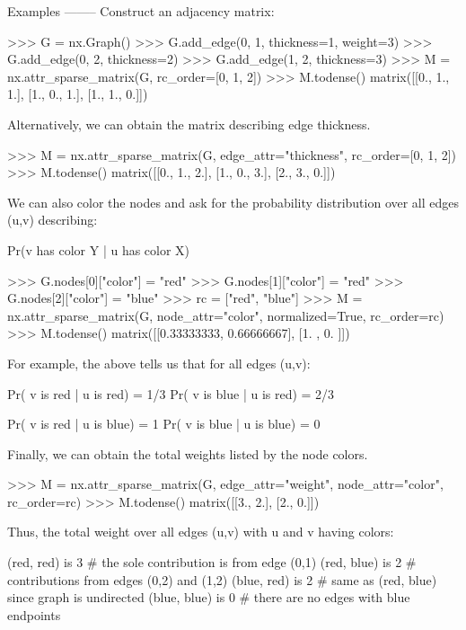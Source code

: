 \begin{DoxyVerb}
Examples
--------
Construct an adjacency matrix:

>>> G = nx.Graph()
>>> G.add_edge(0, 1, thickness=1, weight=3)
>>> G.add_edge(0, 2, thickness=2)
>>> G.add_edge(1, 2, thickness=3)
>>> M = nx.attr_sparse_matrix(G, rc_order=[0, 1, 2])
>>> M.todense()
matrix([[0., 1., 1.],
        [1., 0., 1.],
        [1., 1., 0.]])

Alternatively, we can obtain the matrix describing edge thickness.

>>> M = nx.attr_sparse_matrix(G, edge_attr="thickness", rc_order=[0, 1, 2])
>>> M.todense()
matrix([[0., 1., 2.],
        [1., 0., 3.],
        [2., 3., 0.]])

We can also color the nodes and ask for the probability distribution over
all edges (u,v) describing:

    Pr(v has color Y | u has color X)

>>> G.nodes[0]["color"] = "red"
>>> G.nodes[1]["color"] = "red"
>>> G.nodes[2]["color"] = "blue"
>>> rc = ["red", "blue"]
>>> M = nx.attr_sparse_matrix(G, node_attr="color", normalized=True, rc_order=rc)
>>> M.todense()
matrix([[0.33333333, 0.66666667],
        [1.        , 0.        ]])

For example, the above tells us that for all edges (u,v):

    Pr( v is red  | u is red)  = 1/3
    Pr( v is blue | u is red)  = 2/3

    Pr( v is red  | u is blue) = 1
    Pr( v is blue | u is blue) = 0

Finally, we can obtain the total weights listed by the node colors.

>>> M = nx.attr_sparse_matrix(G, edge_attr="weight", node_attr="color", rc_order=rc)
>>> M.todense()
matrix([[3., 2.],
        [2., 0.]])

Thus, the total weight over all edges (u,v) with u and v having colors:

    (red, red)   is 3   # the sole contribution is from edge (0,1)
    (red, blue)  is 2   # contributions from edges (0,2) and (1,2)
    (blue, red)  is 2   # same as (red, blue) since graph is undirected
    (blue, blue) is 0   # there are no edges with blue endpoints\end{DoxyVerb}
 